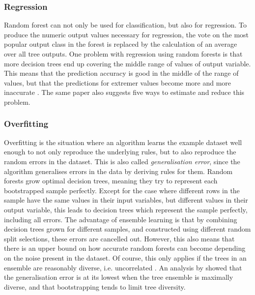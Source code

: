 \documentclass[a4paper,man,12pt,apacite,floatsintext,draftfirst]{apa6} %
\begin{document}
\subsubsection{Regression}
Random forest can not only be used for classification, but also for regression.
To produce the numeric output values necessary for regression,
the vote on the most popular output class in the forest is replaced by the
calculation of an average over all tree outputs.
One problem with regression using random forests is that more decision trees
end up covering the middle range of values of output variable.
This means that the prediction accuracy is good in the middle of the range
of values, but that the predictions for extremer values become more and more
inaccurate \cite{zhang2012bias}.
The same paper also suggests five ways to estimate and reduce this problem.

\subsubsection{Overfitting}
Overfitting \cite{wpOF} is the situation where an algorithm learns the
example dataset well enough to not only reproduce the underlying rules,
but to also reproduce the random errors in the dataset.
This is also called \emph{generalisation error}, since the algorithm
generalises errors in the data by deriving rules for them.
Random forests grow optimal decision trees, meaning they try to represent
each bootstrapped sample perfectly.
Except for the case where different rows in the sample have the same
values in their input variables, but different values in their output variable,
this leads to decision trees which represent the sample perfectly,
including all errors.
The advantage of ensemble learning is that by combining decision trees grown
for different samples, and constructed using different random split selections,
these errors are cancelled out.
However, this also means that there is an upper bound on how accurate
random forests can become depending on the noise present in the dataset.
Of course, this only applies if the trees in an ensemble are reasonably
diverse, i.e. uncorrelated \cite{breiman2001random}.
An analysis by  showed that the generalisation error
is at its lowest when the tree ensemble is maximally diverse,
and that bootstrapping tends to limit tree diversity.
\end{document}
